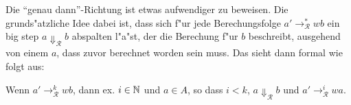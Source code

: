 \documentclass[12pt,a4paper,final]{article}
\begin{document}
Die ``genau dann''-Richtung ist etwas aufwendiger zu beweisen. Die grunds"atzliche Idee dabei
ist, dass sich f"ur jede Berechungsfolge \mbox{$a' \rightarrow_{\mathcal{R}}^* wb$} ein big step
\mbox{$a \Downarrow_{\mathcal{R}} b$} abspalten l"a"st, der die Berechung f"ur $b$ beschreibt, ausgehend
von einem $a$, dass zuvor berechnet worden sein muss. Das sieht dann formal wie folgt aus:
\begin{lemma}
  Wenn \mbox{$a' \rightarrow_{\mathcal{R}}^k wb$}, dann ex. \mbox{$i \in \mathbb N$} und \mbox{$a \in A$}, so dass
  \mbox{$i < k$}, \mbox{$a \Downarrow_{\mathcal{R}} b$} und \mbox{$a' \rightarrow_{\mathcal{R}}^i wa$}.
\end{lemma}





\end{document}
